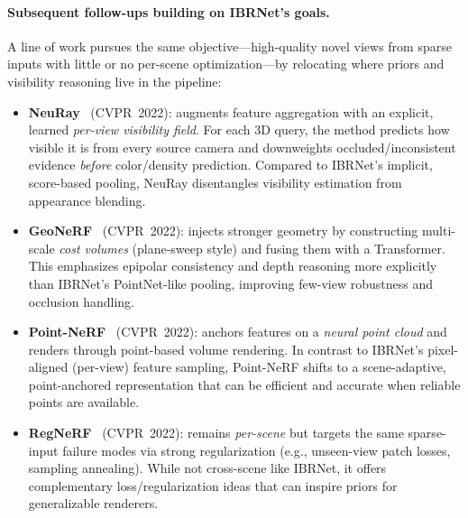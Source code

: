 \begin{enrichment}
\begin{enrichment}
     \paragraph{Subsequent follow-ups building on IBRNet’s goals.}
     A line of work pursues the same objective—high-quality novel views from sparse inputs with little or no per-scene optimization—by relocating where priors and visibility reasoning live in the pipeline:
     \begin{itemize}
         \item \textbf{NeuRay}~\cite{liu2022_neuray} (CVPR~2022): augments feature aggregation with an explicit, learned \emph{per-view visibility field}. For each 3D query, the method predicts how visible it is from every source camera and downweights occluded/inconsistent evidence \emph{before} color/density prediction. Compared to IBRNet’s implicit, score-based pooling, NeuRay disentangles visibility estimation from appearance blending.
         \item \textbf{GeoNeRF}~\cite{johari2022_geonerf} (CVPR~2022): injects stronger geometry by constructing multi-scale \emph{cost volumes} (plane-sweep style) and fusing them with a Transformer. This emphasizes epipolar consistency and depth reasoning more explicitly than IBRNet’s PointNet-like pooling, improving few-view robustness and occlusion handling.
         \item \textbf{Point-NeRF}~\cite{xu2022_pointnerf} (CVPR~2022): anchors features on a \emph{neural point cloud} and renders through point-based volume rendering. In contrast to IBRNet’s pixel-aligned (per-view) feature sampling, Point-NeRF shifts to a scene-adaptive, point-anchored representation that can be efficient and accurate when reliable points are available.
         \item \textbf{RegNeRF}~\cite{niemeyer2022_regnerf} (CVPR~2022): remains \emph{per-scene} but targets the same sparse-input failure modes via strong regularization (e.g., unseen-view patch losses, sampling annealing). While not cross-scene like IBRNet, it offers complementary loss/regularization ideas that can inspire priors for generalizable renderers.
     \end{itemize}
     

\end{enrichment}
\end{enrichment}
